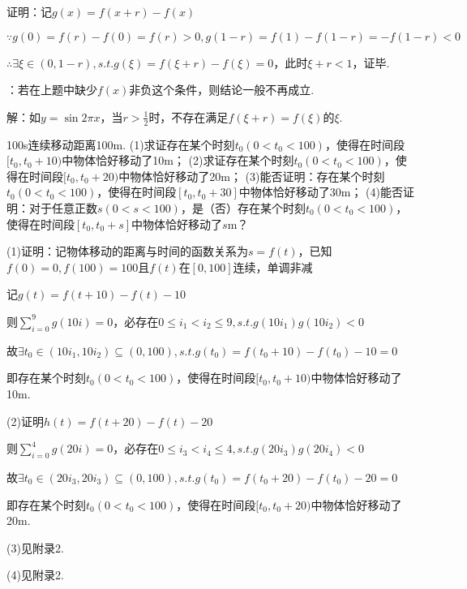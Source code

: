 \documentclass[12pt,UTF8]{ctexart}
\begin{document}
\begin{enumerate}
证明：记$g(x)=f(x+r)-f(x)$

$\because g(0)=f(r)-f(0)=f(r)>0,g(1-r)=f(1)-f(1-r)=-f(1-r)<0$

$\therefore\exists\xi\in(0,1-r),s.t.g(\xi)=f(\xi+r)-f(\xi)=0$，此时$\xi+r<1$，证毕.

：若在上题中缺少$f(x)$非负这个条件，则结论一般不再成立.

解：如$y=\sin2\pi x$，当$r>\frac12$时，不存在满足$f(\xi+r)=f(\xi)$的$\xi$.

100s连续移动距离100m.
\newline
(1)求证存在某个时刻$t_0(0<t_0<100)$，使得在时间段$[t_0,t_0+10)$中物体恰好移动了10m；
\newline
(2)求证存在某个时刻$t_0(0<t_0<100)$，使得在时间段$[t_0,t_0+20)$中物体恰好移动了20m；
\newline
(3)能否证明：存在某个时刻$t_0(0<t_0<100)$，使得在时间段$[t_0,t_0+30]$中物体恰好移动了30m；
\newline
(4)能否证明：对于任意正数$s(0<s<100)$，是（否）存在某个时刻$t_0(0<t_0<100)$，使得在时间段$[t_0,t_0+s]$中物体恰好移动了$s$m？

(1)证明：记物体移动的距离与时间的函数关系为$s=f(t)$，已知$f(0)=0,f(100)=100$且$f(t)$在$[0,100]$连续，单调非减

记$g(t)=f(t+10)-f(t)-10$

则$\sum_{i=0}^9g(10i)=0$，必存在$0\leq i_1<i_2\leq9,s.t.g(10i_1)g(10i_2)<0$

故$\exists t_0\in(10i_1,10i_2)\subseteq(0,100),s.t.g(t_0)=f(t_0+10)-f(t_0)-10=0$

即存在某个时刻$t_0(0<t_0<100)$，使得在时间段$[t_0,t_0+10)$中物体恰好移动了10m.

(2)证明$h(t)=f(t+20)-f(t)-20$

则$\sum_{i=0}^4g(20i)=0$，必存在$0\leq i_3<i_4\leq4,s.t.g(20i_3)g(20i_4)<0$

故$\exists t_0\in(20i_3,20i_3)\subseteq(0,100),s.t.g(t_0)=f(t_0+20)-f(t_0)-20=0$

即存在某个时刻$t_0(0<t_0<100)$，使得在时间段$[t_0,t_0+20)$中物体恰好移动了20m.
%
%
%
%
%
%
%
%
%
%
%
%

(3)见附录2.

(4)见附录2.
\end{enumerate}
\end{document}
